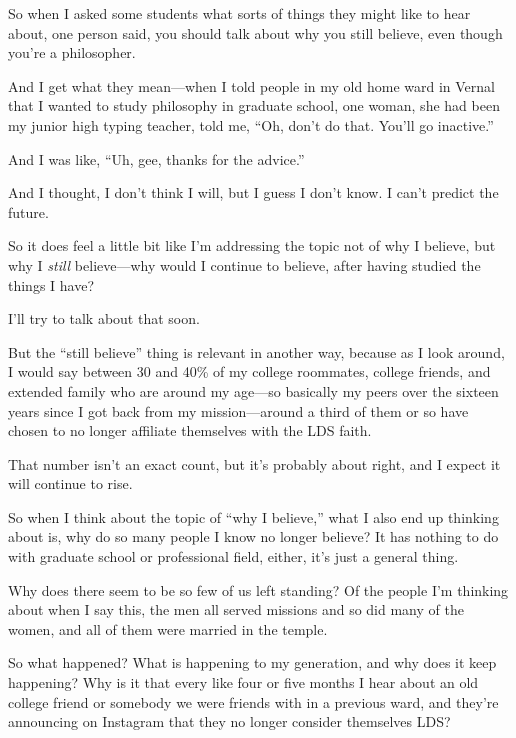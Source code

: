 \begin{compactitem}
			\item So when I asked some students what sorts of things they might like to hear about, one person said, you should talk about why you still believe, even though you're a philosopher.
				\begin{compactitem}
					\item And I get what they mean---when I told people in my old home ward in Vernal that I wanted to study philosophy in graduate school, one woman, she had been my junior high typing teacher, told me, ``Oh, don't do that. You'll go inactive.''
					\item And I was like, ``Uh, gee, thanks for the advice.''
					\item And I thought, I don't think I will, but I guess I don't know. I can't predict the future.
					\item So it does feel a little bit like I'm addressing the topic not of why I believe, but why I \textit{still} believe---why would I continue to believe, after having studied the things I have?
					\item I'll try to talk about that soon.
					\item But the ``still believe'' thing is relevant in another way, because as I look around, I would say between 30 and 40\% of my college roommates, college friends, and extended family who are around my age---so basically my peers over the sixteen years since I got back from my mission---around a third of them or so have chosen to no longer affiliate themselves with the LDS faith.
					\item That number isn't an exact count, but it's probably about right, and I expect it will continue to rise.
					\item So when I think about the topic of ``why I believe,'' what I also end up thinking about is, why do so many people I know no longer believe? It has nothing to do with graduate school or professional field, either, it's just a general thing.
					\item Why does there seem to be so few of us left standing? Of the people I'm thinking about when I say this, the men all served missions and so did many of the women, and all of them were married in the temple.
					\item So what happened? What is happening to my generation, and why does it keep happening? Why is it that every like four or five months I hear about an old college friend or somebody we were friends with in a previous ward, and they're announcing on Instagram that they no longer consider themselves LDS?

\end{compactitem}
\end{compactitem}
